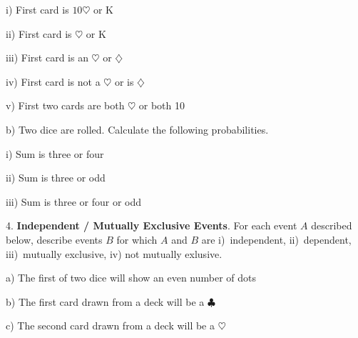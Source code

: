 \documentclass[10pt]{article}
\begin{document}
\hspace{30pt} i) First card is $10\heartsuit$ or $\mbox{K}$
\bigskip
\bigskip

\hspace{30pt} ii) First card is $\heartsuit$ or $\mbox{K}$
\bigskip
\bigskip

\hspace{30pt} iii) First card is an $\heartsuit$ or $\diamondsuit$
\bigskip
\bigskip

\hspace{30pt} iv) First card is not a $\heartsuit$ or is $\diamondsuit$
\bigskip
\bigskip

\hspace{30pt} v) First two cards are both $\heartsuit$ or both 10
\bigskip
\bigskip

\hspace{20pt} b) Two dice are rolled. Calculate the following probabilities.
\medskip
\bigskip

\hspace{30pt} i) Sum is three or four
\bigskip
\bigskip

\hspace{30pt} ii) Sum is three or odd
\bigskip
\bigskip

\hspace{30pt} iii) Sum is three or four or odd
\vfill
\eject

4. \textbf{Independent / Mutually Exclusive Events}. 
For each event $A$ described below, describe events $B$ for which
$A$ and $B$ are
i)~independent, ii)~dependent,
iii)~mutually exclusive, iv) not mutually exlusive.
\medskip

\hspace{20pt} a) The first of two dice will show an even number of dots
\vspace{1in}


\hspace{20pt} b) The first card drawn from a deck will be a $\clubsuit$
\vspace{1in}


\hspace{20pt} c) The second card drawn from a deck will be a $\heartsuit$
\vspace{1in}


\vfill
\eject
\end{document}
